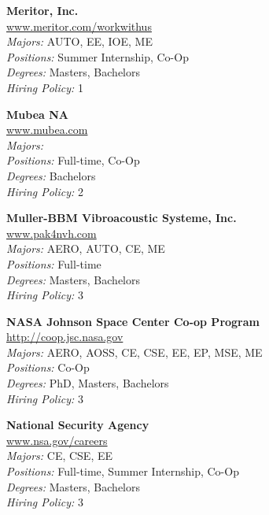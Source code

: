 \documentclass[twoside]{article}
\begin{document}
\begin{center}
\begin{multicols}{3}
\begin{minipage}{.9\columnwidth}{\Large\bf Meritor, Inc. }\\
	\url{www.meritor.com/workwithus}\\
	\emph{Majors:} AUTO, EE, IOE, ME\\
	\emph{Positions:} Summer Internship, Co-Op\\
	\emph{Degrees:} Masters, Bachelors\\
	\emph{Hiring Policy:} 1\\
\end{minipage}
 
\begin{minipage}{.9\columnwidth}{\Large\bf Mubea NA }\\
	\url{www.mubea.com}\\
	\emph{Majors:} \\
	\emph{Positions:} Full-time, Co-Op\\
	\emph{Degrees:} Bachelors\\
	\emph{Hiring Policy:} 2\\
\end{minipage}
 
\begin{minipage}{.9\columnwidth}{\Large\bf Muller-BBM Vibroacoustic Systeme, Inc. }\\
	\url{www.pak4nvh.com}\\
	\emph{Majors:} AERO, AUTO, CE, ME\\
	\emph{Positions:} Full-time\\
	\emph{Degrees:} Masters, Bachelors\\
	\emph{Hiring Policy:} 3\\
\end{minipage}
 
\begin{minipage}{.9\columnwidth}{\Large\bf NASA Johnson Space Center Co-op Program }\\
	\url{http://coop.jsc.nasa.gov}\\
	\emph{Majors:} AERO, AOSS, CE, CSE, EE, EP, MSE, ME\\
	\emph{Positions:} Co-Op\\
	\emph{Degrees:} PhD, Masters, Bachelors\\
	\emph{Hiring Policy:} 3\\
\end{minipage}
 
\begin{minipage}{.9\columnwidth}{\Large\bf National Security Agency }\\
	\url{www.nsa.gov/careers}\\
	\emph{Majors:} CE, CSE, EE\\
	\emph{Positions:} Full-time, Summer Internship, Co-Op\\
	\emph{Degrees:} Masters, Bachelors\\
	\emph{Hiring Policy:} 3\\
\end{minipage}
 

\end{multicols}
\end{center}
\end{document}
